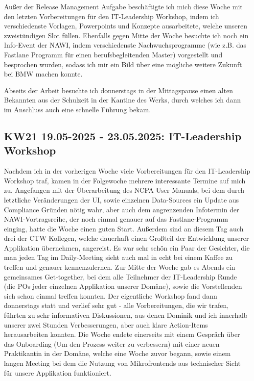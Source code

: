 Außer der Release Management Aufgabe beschäftigte ich mich diese Woche mit den letzten Vorbereitungen für den IT-Leadership Workshop, indem ich verschiedenste Vorlagen, Powerpoints und Konzepte ausarbeitete, welche unseren zweistündigen Slot füllen.
Ebenfalls gegen Mitte der Woche besuchte ich noch ein Info-Event der \ac{NAWI}, indem verschiedenste Nachwuchsprogramme (wie z.B. das Fastlane Programm für einen berufsbegleitenden Master) vorgestellt und besprochen wurden, sodass ich mir ein Bild über eine mögliche weitere Zukunft bei BMW machen konnte.

Abseits der Arbeit besuchte ich donnerstags in der Mittagspause einen alten Bekannten aus der Schulzeit in der Kantine des Werks, durch welches ich dann im Anschluss auch eine schnelle Führung bekam.



\subsection{KW21 19.05-2025 - 23.05.2025: IT-Leadership Workshop}
Nachdem ich in der vorherigen Woche viele Vorbereitungen für den IT-Leadership Workshop traf, kamen in der Folgewoche mehrere interessante Termine auf mich zu.
Angefangen mit der Überarbeitung des \ac{NCPA}-User-Manuals, bei dem durch letztliche Veränderungen der UI, sowie einzelnen Data-Sources ein Update aus Compliance Gründen nötig wahr, aber auch dem angrenzenden Infotermin der \ac{NAWI}-Vortragsreihe, der noch einmal genauer auf das Fastlane-Programm einging, hatte die Woche einen guten Start.
Außerdem sind an diesem Tag auch drei der \ac{CTW} Kollegen, welche dauerhaft einen Großteil der Entwicklung unserer Applikation übernehmen, angereist.
Es war sehr schön ein Paar der Gesichter, die man jeden Tag im Daily-Meeting sieht auch mal in echt bei einem Kaffee zu treffen und genauer kennenzulernen.
Zur Mitte der Woche gab es Abends ein gemeinsames Get-together, bei dem alle Teilnehmer der IT-Leadership Runde (die \acp{PO} jeder einzelnen Applikation unserer Domäne), sowie die Vorstellenden sich schon einmal treffen konnten.
Der eigentliche Workshop fand dann donnerstags statt und verlief sehr gut - alle Vorbereitungen, die wir trafen, führten zu sehr informativen Diskussionen, aus denen Dominik und ich innerhalb unserer zwei Stunden Verbesserungen, aber auch klare Action-Items herausarbeiten konnten.
Die Woche endete einerseits mit einem Gespräch über das Onboarding (Um den Prozess weiter zu verbessern) mit einer neuen Praktikantin in der Domäne, welche eine Woche zuvor begann, sowie einem langen Meeting bei dem die Nutzung von Mikrofrontends aus technischer Sicht für unsere Applikation funktioniert.


